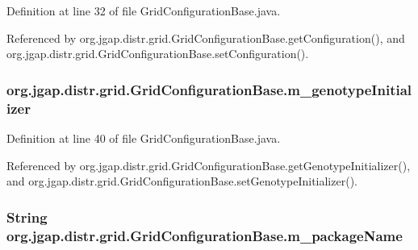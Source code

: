 Definition at line 32 of file Grid\-Configuration\-Base.\-java.



Referenced by org.\-jgap.\-distr.\-grid.\-Grid\-Configuration\-Base.\-get\-Configuration(), and org.\-jgap.\-distr.\-grid.\-Grid\-Configuration\-Base.\-set\-Configuration().

\hypertarget{classorg_1_1jgap_1_1distr_1_1grid_1_1_grid_configuration_base_a66bacb4d0aa95c298632f9115acdedae}{
\subsubsection[{m\-\_\-genotype\-Initializer}]{ org.\-jgap.\-distr.\-grid.\-Grid\-Configuration\-Base.\-m\-\_\-genotype\-Initializer\hspace{0.3cm}{\ttfamily [private]}}}\label{classorg_1_1jgap_1_1distr_1_1grid_1_1_grid_configuration_base_a66bacb4d0aa95c298632f9115acdedae}


Definition at line 40 of file Grid\-Configuration\-Base.\-java.



Referenced by org.\-jgap.\-distr.\-grid.\-Grid\-Configuration\-Base.\-get\-Genotype\-Initializer(), and org.\-jgap.\-distr.\-grid.\-Grid\-Configuration\-Base.\-set\-Genotype\-Initializer().

\hypertarget{classorg_1_1jgap_1_1distr_1_1grid_1_1_grid_configuration_base_aa945d00497aaa8539b77d8f399b83120}{
\subsubsection[{m\-\_\-package\-Name}]{\setlength{\rightskip}{0pt plus 5cm}String org.\-jgap.\-distr.\-grid.\-Grid\-Configuration\-Base.\-m\-\_\-package\-Name\hspace{0.3cm}{\ttfamily [private]}}}\label{classorg_1_1jgap_1_1distr_1_1grid_1_1_grid_configuration_base_aa945d00497aaa8539b77d8f399b83120}


